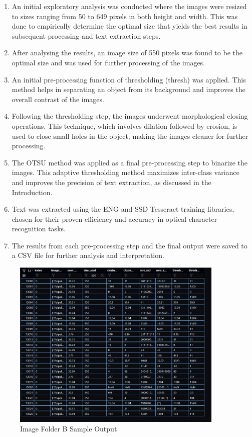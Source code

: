 \begin{enumerate}
    \item An initial exploratory analysis was conducted where the images were resized to sizes ranging from 50 to 649 pixels in both height and width. This was done to empirically determine the optimal size that yields the best results in subsequent processing and text extraction steps.
    \item After analysing the results, an image size of 550 pixels was found to be the optimal size and was used for further processing of the images.
    \item An initial pre-processing function of thresholding (thresh) was applied. This method helps in separating an object from its background and improves the overall contrast of the images.
    \item Following the thresholding step, the images underwent morphological closing operations. This technique, which involves dilation followed by erosion, is used to close small holes in the object, making the images cleaner for further processing.
    \item The OTSU method was applied as a final pre-processing step to binarize the images. This adaptive thresholding method maximizes inter-class variance and improves the precision of text extraction, as discussed in the Introduction.
    \item Text was extracted using the ENG and SSD Tesseract training libraries, chosen for their proven efficiency and accuracy in optical character recognition tasks.
    \item The results from each pre-processing step and the final output were saved to a CSV file for further analysis and interpretation.

\end{enumerate}

\begin{figure}[ht]
    \centering
    \includegraphics[width=0.9\textwidth]{Figures/Methodology/sipa_03/sample_output.jpg}
    \caption[Image Folder B Sample Output]{Image Folder B Sample Output}
    \label{fig:Image Folder B Sample Output}
\end{figure}

